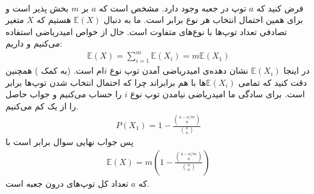 \\
فرض کنید که
$a$
توپ در جعبه وجود دارد. مشخص است که
$a$ بر $m$
بخش پذیر است و برای همین احتمال انتخاب هر نوع برابر است. ما به دنبال
$\mathbb{E}(X)$
هستیم که
$X$
متغیر تصادفی تعداد توپ‌ها با نوع‌های متفاوت است. حال از خواص امیدریاضی استفاده می‌کنیم و داریم:
\begin{gather*}
    \mathbb{E}(X) = \sum_{i=1}^{m} \mathbb{E}(X_i) = m\mathbb{E}(X_1)
\end{gather*}
در اینجا
$\mathbb{E}(X_i)$
نشان دهده‌ی امیدریاضی آمدن توپ نوع
$i$ام است.
(به کمک
)
همچنین دقت کنید که تمامی
$\mathbb{E}(X_i)$ها
با هم برابر‌اند چرا که احتمال انتخاب شدن توپ‌ها برابر است.
برای سادگی ما امیدریاضی نیامدن توپ نوع
$i$
را حساب می‌کنیم و جواب حاصل را از یک کم می‌کنیم.
\begin{gather*}
    P(X_1) = 1 - \frac{{a - a/m \choose n}}{{a \choose n}}
\end{gather*}
پس جواب نهایی سوال برابر است با
\begin{gather*}
    \mathbb{E}(X) = m (1 - \frac{{a - a/m \choose n}}{{a \choose n}})
\end{gather*}
که
$a$
تعداد کل توپ‌های درون جعبه است.